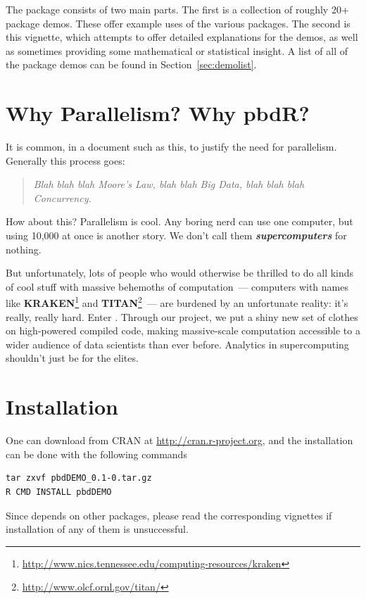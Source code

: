 The  package consists of two main parts. The first is a
collection of roughly 20+ package demos. These offer example uses of
the various  packages. The second is this vignette, which
attempts to offer detailed explanations for the demos, as well as sometimes
providing some mathematical or statistical insight. A list of all of the
package demos can be found in Section~\ref{sec:demolist}.



\section{Why Parallelism?  Why pbdR?}

It is common, in a document such as this, to justify the need for parallelism.
Generally this process goes:

\begin{quote}
\emph{
Blah blah blah Moore's Law, blah blah Big Data, blah blah blah Concurrency.
}
\end{quote}

How about this? Parallelism is cool. Any boring nerd can use one computer,
but using 10,000 at once is another story. We don't call them
\emph{\textbf{supercomputers}} for nothing.

But unfortunately, lots of people who would otherwise be thrilled to do all
kinds of cool stuff with massive behemoths of computation~--- computers with
names like \textbf{KRAKEN}\footnote{
\url{http://www.nics.tennessee.edu/computing-resources/kraken}
} and \textbf{TITAN}\footnote{
\url{http://www.olcf.ornl.gov/titan/}
}~--- are burdened by an
unfortunate reality:  it's really, really hard.
Enter . Through our project, we put a shiny new set of
clothes on high-powered compiled code, making massive-scale computation
accessible to a wider audience of data scientists than ever before.
Analytics in supercomputing shouldn't just be for the elites.



\section[Installation]{Installation}
\label{sec:installation}

One can download  from CRAN at
\url{http://cran.r-project.org}, and
the installation can be done with the following commands
\begin{lstlisting}
tar zxvf pbdDEMO_0.1-0.tar.gz
R CMD INSTALL pbdDEMO
\end{lstlisting}
Since  depends on other  packages, please read
the corresponding vignettes if installation of any of them is unsuccessful.





